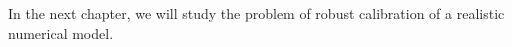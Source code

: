 \documentclass[../../Main_ManuscritThese.tex]{subfiles}
\begin{document}
In the next chapter, we will study the problem of robust calibration of a realistic numerical model.





\subfileLocal{
	\pagestyle{empty}
	
	
}
\end{document}

